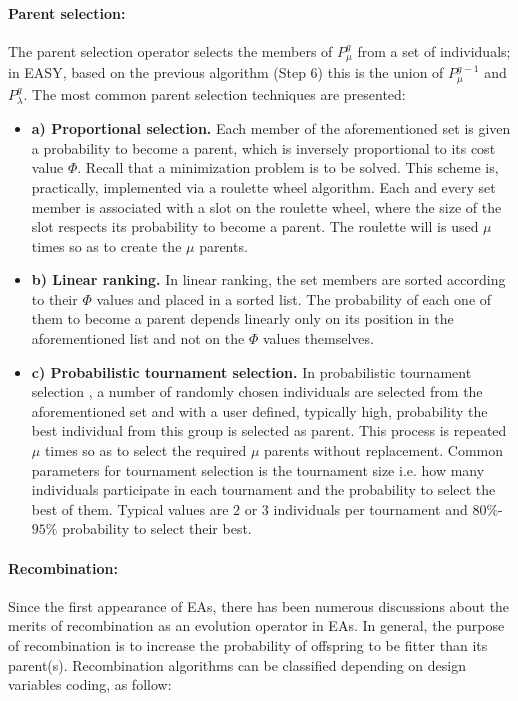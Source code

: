 \paragraph{Parent selection:}
The parent selection operator selects the members of $P_{\mu}^{g}$ from a set of individuals; in EASY, based on the previous algorithm (Step 6) this is the union of $P_{\mu}^{g-1}$ and $P_{\lambda}^g$. The most common parent selection techniques are presented: 
\begin{itemize}
\item[]{\bf a) Proportional selection.} Each member of the aforementioned set is given a probability to become a parent, which is inversely proportional to its cost value $\Phi$. Recall that a minimization problem is to be solved. This scheme is, practically, implemented via a roulette wheel algorithm. Each and every set member is associated with a slot on the roulette wheel, where the size of the slot respects its probability to become a parent. The roulette will is used $\mu$ times so as to create the $\mu$ parents.  
\item[]{\bf b) Linear ranking.} In linear ranking, the set members are sorted according to their $\Phi$ values and placed in a sorted list. The probability of each one of them to become a parent depends linearly only on its position in the aforementioned list and not on the $\Phi$ values themselves.
\item[]{\bf c) Probabilistic tournament selection.}
In probabilistic tournament selection \cite{goldberg1991}, a number of randomly chosen individuals are selected from the aforementioned set and with a user defined, typically high, probability the best individual from this group is selected as parent. This process is repeated $\mu$ times so as to select the required $\mu$ parents without replacement. Common parameters for tournament selection is the tournament size i.e. how many individuals participate in each tournament and the probability to select the best of them. Typical values are $2$ or $3$ individuals per tournament and $80\%$-$95\%$ probability to select their best.
\end{itemize}

\paragraph{Recombination:}
Since the first appearance of EAs, there has been numerous discussions about the merits of recombination as an evolution operator in EAs. In general, the purpose of recombination is to increase the probability of offspring to be fitter than its parent(s). Recombination algorithms can be classified depending on design variables coding, as follow: 

